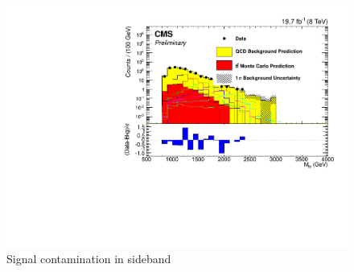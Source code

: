 \begin{figure}[Htcb]
\centering
\includegraphics[width=1.0\textwidth]{AN-13-004/figs/NewMtbSB3semilogwithsignal.pdf}
\caption{Signal contamination in sideband}
\label{figs:sigSB3}
\end{figure}






